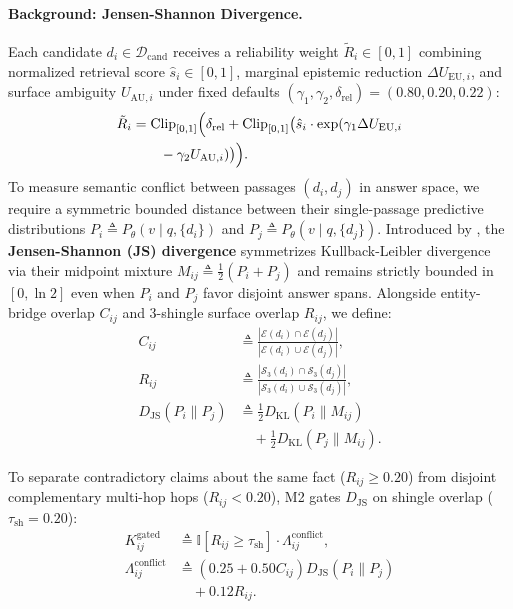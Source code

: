 \documentclass[11pt]{article}
\begin{document}
\paragraph{Background: Jensen-Shannon Divergence.}
Each candidate $d_i \in \mathcal{D}_{\text{cand}}$ receives a reliability weight $\tilde{R}_i \in [0, 1]$ combining normalized retrieval score $\hat{s}_i \in [0, 1]$, marginal epistemic reduction $\Delta U_{\text{EU}, i}$, and surface ambiguity $U_{\text{AU}, i}$ under fixed defaults $(\gamma_1, \gamma_2, \delta_{\text{rel}}) = (0.80, 0.20, 0.22)$:
\begin{align}
\tilde{R}_i &= \text{Clip}_{[0, 1]}\Bigl( \delta_{\text{rel}} + \text{Clip}_{[0, 1]}\bigl( \hat{s}_i \cdot \exp(\gamma_1 \Delta U_{\text{EU}, i} \nonumber \\
&\qquad - \gamma_2 U_{\text{AU}, i}) \bigr) \Bigr).
\label{eq:m2_reliability}
\end{align}
To measure semantic conflict between passages $(d_i, d_j)$ in answer space, we require a symmetric bounded distance between their single-passage predictive distributions $P_i \triangleq P_{\theta}(v \mid q, \{d_i\})$ and $P_j \triangleq P_{\theta}(v \mid q, \{d_j\})$. Introduced by \citet{lin1991divergence}, the \textbf{Jensen-Shannon (JS) divergence} symmetrizes Kullback-Leibler divergence via their midpoint mixture $M_{ij} \triangleq \frac{1}{2}(P_i + P_j)$ and remains strictly bounded in $[0, \ln 2]$ even when $P_i$ and $P_j$ favor disjoint answer spans. Alongside entity-bridge overlap $C_{ij}$ and 3-shingle surface overlap $R_{ij}$, we define:
\begin{align}
C_{ij} &\triangleq \frac{|\mathcal{E}(d_i) \cap \mathcal{E}(d_j)|}{|\mathcal{E}(d_i) \cup \mathcal{E}(d_j)|}, \label{eq:m2_c} \\
R_{ij} &\triangleq \frac{|\mathcal{S}_3(d_i) \cap \mathcal{S}_3(d_j)|}{|\mathcal{S}_3(d_i) \cup \mathcal{S}_3(d_j)|}, \label{eq:m2_r} \\
D_{\text{JS}}(P_i \parallel P_j) &\triangleq \tfrac{1}{2}D_{\text{KL}}(P_i \parallel M_{ij}) \nonumber \\
&\quad + \tfrac{1}{2}D_{\text{KL}}(P_j \parallel M_{ij}). \label{eq:m2_djs}
\end{align}

To separate contradictory claims about the same fact ($R_{ij} \ge 0.20$) from disjoint complementary multi-hop hops ($R_{ij} < 0.20$), M2 gates $D_{\text{JS}}$ on shingle overlap ($\tau_{\text{sh}} = 0.20$):
\begin{align}
K_{ij}^{\text{gated}} &\triangleq \mathbb{I}[R_{ij} \ge \tau_{\text{sh}}] \cdot \Lambda_{ij}^{\text{conflict}}, \label{eq:m2_gated_conflict} \\
\Lambda_{ij}^{\text{conflict}} &\triangleq (0.25 + 0.50 C_{ij}) D_{\text{JS}}(P_i \parallel P_j) \nonumber \\
&\quad + 0.12 R_{ij}. \nonumber
\end{align}
\end{document}
